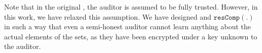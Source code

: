 Note that in the original  \SCpc, the auditor is assumed to be fully trusted. However, in this work, we have relaxed this assumption. We have designed \epsi and $\mathtt{resComp}(.)$ in such a way that even a semi-honest auditor cannot learn anything about the actual elements of the sets, as they have been encrypted under a key unknown to the auditor. 























